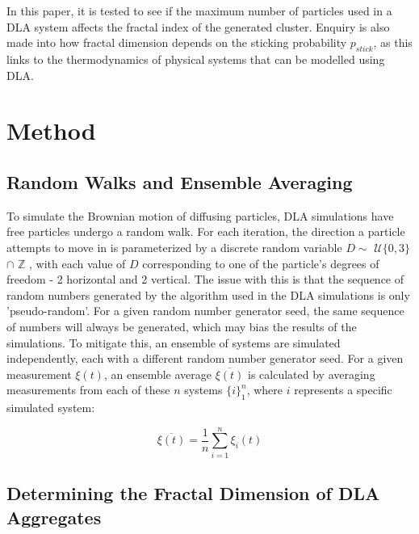\documentclass[11pt]{iopart}
\begin{document}
In this paper, it is tested to see if the maximum number of particles used in a DLA system affects the fractal index of the generated cluster. Enquiry is also made into how fractal dimension depends on the sticking probability $p_{stick}$, as this links to the thermodynamics of physical systems that can be modelled using DLA.

\section{Method}
\subsection{Random Walks and Ensemble Averaging}
To simulate the Brownian motion of diffusing particles, DLA simulations have free particles undergo a random walk. For each iteration, the direction a particle attempts to move in is parameterized by a discrete random variable $D \sim$ $\mathcal{U}\{0, 3\}$ $\cap$ $\mathbb{Z}$ , with each value of $D$ corresponding to one of the particle's degrees of freedom - 2 horizontal and 2 vertical. The issue with this is that the sequence of random numbers generated by the algorithm used in the DLA simulations is only 'pseudo-random'. For a given random number generator seed, the same sequence of numbers will always be generated, which may bias the results of the simulations. To mitigate this, an ensemble of systems are simulated independently, each with a different random number generator seed. For a given measurement $\xi(t)$, an ensemble average $\overline{\xi(t)}$ is calculated by averaging measurements from each of these $n$ systems $\{i\}_1^n$, where $i$ represents a specific simulated system:


\begin{equation}
\label{averageequation}
\overline{\xi(t)} = \frac{1}{n}\sum_{i=1}^{n}{\xi_i(t)}
\end{equation}


\subsection{Determining the Fractal Dimension of DLA Aggregates}
\end{document}
